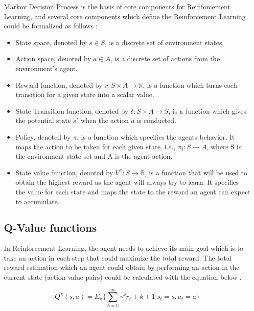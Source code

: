 \documentclass[12pt,twoside]{article}
\theoremstyle{plain}
\theoremstyle{definition}
\theoremstyle{remark}
\begin{document}
Markov Decision Process is the basis of core components for Reinforcement Learning, and several core components which define the Reinforcement Learning could be formalized as follows \cite{baier2007learning}:
\begin{itemize}
\item State space, denoted by $s \in S$, is a discrete set of environment states.

\item Action space, denoted by $a \in A$, is a discrete set of actions from the environment's agent.

\item Reward function, denoted by $r : S \times A \rightarrow \mathbb{R}$, is a function which turns each transition for a given state into a scalar value.

\item State Transition function, denoted by $\delta : S \times A \rightarrow S$, is a  function which gives the potential state $s'$ when the action $a$ is conducted.

\item Policy, denoted by $\pi$, is a function which specifies the agents behavior. It maps the action to be taken for each given state. i.e., $\pi_t : S \rightarrow A$, where S is the environment state set and A is the agent action.

\item State value function, denoted by $V^\pi : S \rightarrow \mathbb{R}$, is a function that will be used to obtain the highest reward as the agent will always try to learn. It specifies the value for each state and maps the state to the reward an agent can expect to accumulate. 
\end{itemize}

\subsection{Q-Value functions}

In Reinforcement Learning, the agent needs to achieve its main goal which is to take an action in each step that could maximize the total reward. The total reward estimation which an agent could obtain by performing an action in the current state (action-value pairs) could be calculated with the equation below \cite{Sutton1998introduction}.


\begin{equation} \label{eq2}
Q^\pi(s,a) = E_\pi \{ \sum_{k=0}^{\infty} \gamma^k r_t + k +1 | s_t = s, a_t = a \}
\end{equation}
\end{document}
